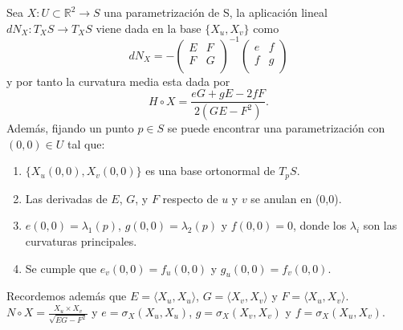 	\begin{proposicion}
		Sea $X : U \subset \mathbb{R}^2 \to S$ una parametrización de S, la aplicación lineal $dN_X : T_X S \to T_X S$ viene dada en la base $\{X_u, X_v \}$ como
		${ }$\\
		\[
			dN_X = - \left( {\begin{array}{cc}
						E & F \\
						F & G \\
					\end{array} } \right)^{-1}
					\left( {\begin{array}{cc}
						e & f \\
						f & g \\
					\end{array} } \right)
		\]
		${ }$\\
		y por tanto la curvatura media esta dada por
		${ }$\\
		\[
			H \circ X = \frac{eG + gE -2fF}{2(GE-F^2)}.
		\]
		${ }$\\
		
		Además, fijando un punto $p \in S$ se puede encontrar una parametrización con $(0,0) \in U$ tal que:
		
		\begin{enumerate}
			\item $\{X_u(0,0), X_v(0,0) \}$ es una base ortonormal de $T_p S$.
			\item Las derivadas de $E$, $G$, y $F$ respecto de $u$ y $v$ se anulan en (0,0).
			\item $e(0,0) = \lambda_{1}(p)$, $g(0,0) = \lambda_{2}(p)$ y $f(0,0) = 0$, donde los $\lambda_i$ son las curvaturas principales.
			\item Se cumple que $e_v(0,0) = f_u(0,0)$ y $g_u(0,0) = f_v(0,0)$.
		\end{enumerate}
		
		Recordemos además que $E = \langle X_u, X_u \rangle$, $G = \langle X_v, X_v \rangle$ y $F = \langle X_u, X_v \rangle$. $N \circ X = \frac{X_u \times X_v}{\sqrt{EG-F^2}}$ y $e = \sigma_X(X_u, X_u)$, $g = \sigma_X(X_v, X_v)$ y $f = \sigma_X(X_u, X_v)$.
	\end{proposicion}
	${ }$

